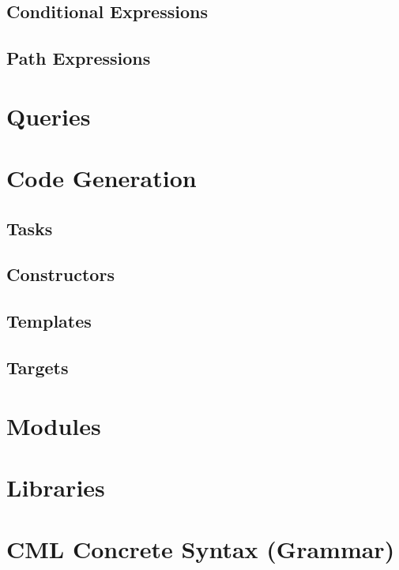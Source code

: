 \documentclass[a4paper,oneside,12pt, extrafontsizes]{memoir}
\theoremstyle{definition}
\theoremstyle{definition}
\theoremstyle{definition}
\theoremstyle{definition}
\theoremstyle{definition}
\begin{document}
\section{Conditional Expressions}
\label{sec:conditionals}


\section{Path Expressions}
\label{sec:paths}


\chapter{Queries}
\label{ch:queries}


\chapter{Code Generation}
\label{ch:codegen}

\section{Tasks}
\label{sec:tasks}

\section{Constructors}
\label{sec:constructors}

\section{Templates}
\label{sec:templates}

\section{Targets}
\label{sec:targets}

\chapter{Modules}
\label{ch:modules}

\chapter{Libraries}
\label{ch:libraries}

\appendix

\chapter{CML Concrete Syntax (Grammar)}
\label{apx:concrete-syntax}

\end{document}
